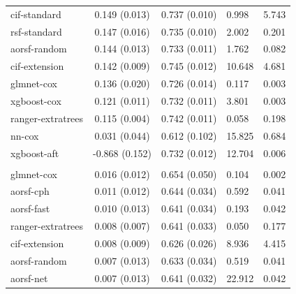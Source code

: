 \documentclass[twoside,11pt]{article}\usepackage[]{graphicx}\usepackage[]{xcolor}
\newenvironment{knitrout}{}{} %
\begin{document}
\begin{knitrout}
\begin{longtable}[t]{lcclc}
\hspace{1em}cif-standard & 0.149 (0.013) & 0.737 (0.010) & 0.998 & 5.743\\
\hspace{1em}rsf-standard & 0.147 (0.016) & 0.735 (0.010) & 2.002 & 0.201\\
\hspace{1em}aorsf-random & 0.144 (0.013) & 0.733 (0.011) & 1.762 & 0.082\\
\hspace{1em}cif-extension & 0.142 (0.009) & 0.745 (0.012) & 10.648 & 4.681\\
\hspace{1em}glmnet-cox & 0.136 (0.020) & 0.726 (0.014) & 0.117 & 0.003\\
\hspace{1em}xgboost-cox & 0.121 (0.011) & 0.732 (0.011) & 3.801 & 0.003\\
\hspace{1em}ranger-extratrees & 0.115 (0.004) & 0.742 (0.011) & 0.058 & 0.198\\
\hspace{1em}nn-cox & 0.031 (0.044) & 0.612 (0.102) & 15.825 & 0.684\\
\hspace{1em}xgboost-aft & -0.868 (0.152) & 0.732 (0.012) & 12.704 & 0.006\\
\addlinespace[0.3em]
\hline
\multicolumn{5}{l}{\textit{\textbf{Monoclonal gammopathy; malignancy, n = 1384, p = 8}}}\\
\hline
\hspace{1em}glmnet-cox & 0.016 (0.012) & 0.654 (0.050) & 0.104 & 0.002\\
\hspace{1em}aorsf-cph & 0.011 (0.012) & 0.644 (0.034) & 0.592 & 0.041\\
\hspace{1em}aorsf-fast & 0.010 (0.013) & 0.641 (0.034) & 0.193 & 0.042\\
\hspace{1em}ranger-extratrees & 0.008 (0.007) & 0.641 (0.033) & 0.050 & 0.177\\
\hspace{1em}cif-extension & 0.008 (0.009) & 0.626 (0.026) & 8.936 & 4.415\\
\hspace{1em}aorsf-random & 0.007 (0.013) & 0.633 (0.034) & 0.519 & 0.041\\
\hspace{1em}aorsf-net & 0.007 (0.013) & 0.641 (0.032) & 22.912 & 0.042\\

\end{longtable}
\end{knitrout}
\end{document}
